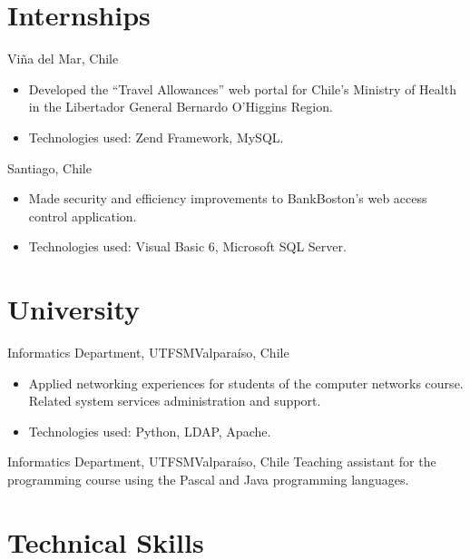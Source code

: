 \documentclass[sans,letter]{moderncv}
\begin{document}
\section{Internships}

{Viña del Mar, Chile}{}{\begin{itemize}
\item Developed the ``Travel Allowances'' web portal for Chile’s Ministry of Health in the Libertador General Bernardo O'Higgins Region.
\item Technologies used: Zend Framework, MySQL.
\end{itemize}}

{Santiago, Chile}{}{\begin{itemize}
  \item Made security and efficiency improvements to BankBoston's web access
  control application.
  \item Technologies used: Visual Basic 6, Microsoft SQL Server.
\end{itemize}}

\section{University}

{Informatics Department, UTFSM}{Valparaíso, Chile}{}
{
\begin{itemize}
\item Applied networking experiences for students of the computer networks
course. Related system services administration and support.
\item Technologies used: Python, LDAP, Apache.
\end{itemize}
}

{Informatics Department, UTFSM}{Valparaíso, Chile}{}
{Teaching assistant for the programming course using the Pascal and Java programming
languages.}

\section{Technical Skills}
\end{document}
